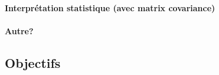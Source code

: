 \paragraph{Interprétation statistique (avec matrix covariance)}

\par\paragraph{Autre?}



\subsection{Objectifs}





